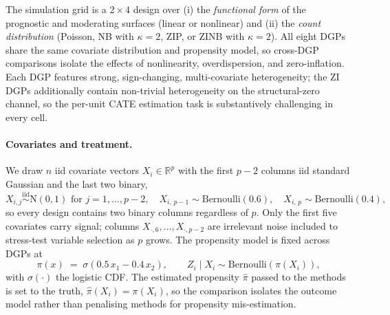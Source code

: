 \documentclass[11pt]{article}
\theoremstyle{plain}
\theoremstyle{definition}
\theoremstyle{remark}
\newcommand{\Ber}{\mathrm{Bernoulli}}
\newcommand{\N}{\mathrm{N}}
\newcommand{\pihat}{\widehat{\pi}}
\begin{document}
The simulation grid is a $2 \times 4$ design over (i) the
\emph{functional form} of the prognostic and moderating surfaces
(linear or nonlinear) and (ii) the \emph{count distribution}
(Poisson, NB with $\kappa = 2$, ZIP, or ZINB with $\kappa = 2$). All
eight DGPs share the same covariate distribution and propensity
model, so cross-DGP comparisons isolate the effects of nonlinearity,
overdispersion, and zero-inflation. Each DGP features strong,
sign-changing, multi-covariate heterogeneity; the ZI DGPs additionally
contain non-trivial heterogeneity on the structural-zero channel, so
the per-unit CATE estimation task is substantively challenging in
every cell.

\paragraph{Covariates and treatment.}
We draw $n$ iid covariate vectors $X_i \in \mathbb{R}^p$ with the
first $p - 2$ columns iid standard Gaussian and the last two binary,
\begin{equation}
  X_{i, j} \stackrel{\mathrm{iid}}{\sim} \N(0, 1) \text{ for } j = 1, \dots, p - 2,
  \quad
  X_{i,\, p-1} \sim \Ber(0.6),
  \quad
  X_{i,\, p} \sim \Ber(0.4),
  \label{eq:method-covariates}
\end{equation}
so every design contains two binary columns regardless of $p$. Only
the first five covariates carry signal; columns $X_{\cdot, 6}, \dots,
X_{\cdot, p - 2}$ are irrelevant noise included to stress-test
variable selection as $p$ grows. The propensity model is fixed
across DGPs at
\begin{equation}
  \pi(x) \;=\; \sigma(0.5\, x_1 - 0.4\, x_2),
  \qquad
  Z_i \mid X_i \sim \Ber(\pi(X_i)),
  \label{eq:method-propensity}
\end{equation}
with $\sigma(\cdot)$ the logistic CDF. The estimated propensity
$\pihat$ passed to the methods is set to the truth, $\pihat(X_i) =
\pi(X_i)$, so the comparison isolates the outcome model rather than
penalising methods for propensity mis-estimation.
\end{document}
